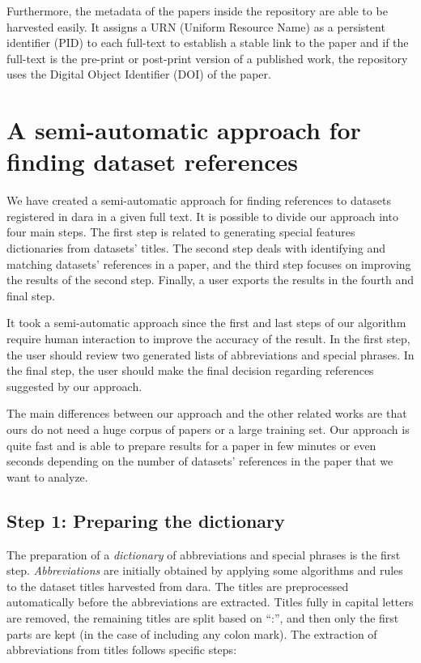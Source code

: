 \documentclass{IOS-Book-Article}
\newcommand{\dara}{\textsf{da\textbar ra}}
\begin{document}
Furthermore, the metadata of the papers inside the repository are able to be harvested easily. 
It assigns a URN (Uniform Resource Name) as a persistent identifier (PID) to each full-text to establish a stable link to the paper and if the full-text is the pre-print or post-print version of a published work, the repository uses the Digital Object Identifier (DOI) of the paper.

\section{A semi-automatic approach for finding dataset references}
\label{sec:approach}
We have created a semi-automatic approach for finding references to datasets registered in {\dara} in a given full text. It is possible to divide our approach into four main steps. The first step is related to generating special features dictionaries from datasets' titles. The second step deals with identifying and matching datasets' references in a paper, and the third step focuses on improving the results of the second step. Finally, a user exports the results in the fourth and final step.

It took a semi-automatic approach since the first and last steps of our algorithm require human interaction to improve the accuracy of the result. In the first step, the user should review two generated lists of abbreviations and special phrases. In the final step, the user should make the final decision regarding references suggested by our approach.

The main differences between our approach and the other related works are that ours do not need a huge corpus of papers or a large training set. Our approach is quite fast and is able to prepare results for a paper in few minutes or even seconds depending on the number of datasets' references in the paper that we want to analyze.

\subsection{Step 1: Preparing the dictionary}
\label{sec:preparing-dictionary}
The preparation of a \emph{dictionary} of abbreviations and special phrases is the first step. \emph{Abbreviations} are initially obtained by applying some algorithms and rules to the dataset titles harvested from {\dara}.
The titles are preprocessed automatically before the abbreviations are extracted. Titles fully in capital letters are removed, the remaining titles are split based on \enquote{:}, and then only the first parts are kept (in the case of including any colon mark).
The extraction of abbreviations from titles follows specific steps:
\end{document}
